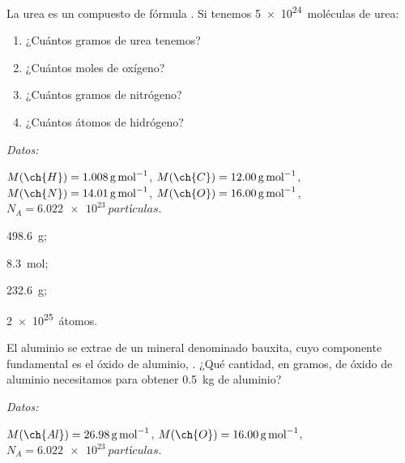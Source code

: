 \documentclass[10pt,a5paper,twoside]{article}
\newenvironment{gexdatos}{
      \vspace{2pt}
      \noindent\small\textit{Datos:}
    }{\vspace{5pt}}
\begin{document}
  \begin{exercise}[
      tags    = {termodinámica, entalpía, entalpia de reacción, calor},
      topics  = {química, termoquímica, termodinámica},
      source  = {FQ 1B SAN 2015, p43, e37},
    ]
    La urea es un compuesto de fórmula . Si tenemos \SI{5e24}{moléculas} de urea:
    \begin{enumerate}
      \item ¿Cuántos gramos de urea tenemos?
      \item ¿Cuántos moles de oxígeno?
      \item ¿Cuántos gramos de nitrógeno?
      \item ¿Cuántos átomos de hidrógeno?
    \end{enumerate}

    \begin{gexdatos}
      \( M(\ch{H}) = \SI{1.008}{\gram\per\mole} \),
      \( M(\ch{C}) = \SI{12.00}{\gram\per\mole} \),
      \( M(\ch{N}) = \SI{14.01}{\gram\per\mole} \),
      \( M(\ch{O}) = \SI{16.00}{\gram\per\mole} \),
      \( N_A = \SI{6.022e23}{partículas}\).
    \end{gexdatos}
  \end{exercise}

  \begin{solution}
    \begin{enumerate*}
      \item \SI{498,6}{\gram}; \item \SI{8,3}{\mole}; \item \SI{232,6}{\gram}; \item \SI{2e25}{átomos}.
    \end{enumerate*}
  \end{solution}




  \begin{exercise}[
      tags    = {termodinámica, entalpía, entalpia de reacción, calor},
      topics  = {química, termoquímica, termodinámica},
      source  = {FQ 1B SAN 2015, p43, e39},
    ]
    El aluminio se extrae de un mineral denominado bauxita,
    cuyo componente fundamental es el óxido de aluminio,
    . ¿Qué cantidad, en gramos, de óxido de aluminio
    necesitamos para obtener \SI{0.5}{\kilo\gram} de aluminio?

    \begin{gexdatos}
      \( M(\ch{Al}) = \SI{26.98}{\gram\per\mole} \),
      \( M(\ch{O}) = \SI{16.00}{\gram\per\mole} \),
      \( N_A = \SI{6.022e23}{partículas}\).
    \end{gexdatos}
  \end{exercise}
\end{document}
